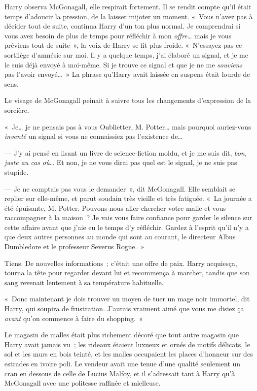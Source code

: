 Harry observa McGonagall, elle respirait fortement.
Il se rendit compte qu'il était temps d'adoucir la pression, de la laisser mijoter un moment.
«~Vous n'avez pas à décider tout de suite, continua Harry d'un ton plus normal.
Je comprendrai si vous avez besoin de plus de temps pour réfléchir à mon \emph{offre}… mais je vous préviens tout de suite~», la voix de Harry se fit plus froide.
«~N'essayez pas ce sortilège d'amnésie sur moi.
Il y a quelque temps, j'ai élaboré un signal, et je me le suis déjà envoyé à moi-même.
Si je trouve ce signal et que je ne me \emph{souviens} pas l'avoir envoyé…~»
La phrase qu'Harry avait laissée en suspens était lourde de sens.

Le visage de McGonagall peinait à suivre tous les changements d'expression de la sorcière.

«~Je… je ne pensais pas à vous Oublietter, M. Potter… mais pourquoi auriez-vous \emph{inventé} un signal si vous ne connaissiez pas l'existence de…

--- J'y ai pensé en lisant un livre de science-fiction moldu, et je me suis dit, \emph{bon, juste au cas où}… Et non, je ne vous dirai pas quel est le signal, je ne suis pas stupide.

--- Je ne comptais pas vous le demander~», dit McGonagall. Elle semblait se replier sur elle-même, et parut soudain très vieille et très fatiguée.
«~La journée a été épuisante, M. Potter. Pouvons-nous aller chercher votre malle et vous raccompagner à la maison~?
Je vais vous faire confiance pour garder le silence sur cette affaire avant que j'aie eu le temps d'y réfléchir.
Gardez à l'esprit qu'il n'y a que deux autres personnes au monde qui sont au courant, le directeur Albus Dumbledore et le professeur Severus Rogue.~»

Tiens. De nouvelles informations~; c'était une offre de paix. Harry acquiesça, tourna la tête pour regarder devant lui et recommença à marcher, tandis que son sang revenait lentement à sa température habituelle.

«~Donc maintenant je dois trouver un moyen de tuer un mage noir immortel, dit Harry, qui soupira de frustration. J'aurais vraiment aimé que vous me disiez ça \emph{avant} qu'on commence à faire du shopping.~»

\later

Le magasin de malles était plus richement décoré que tout autre magasin que Harry avait jamais vu~;
les rideaux étaient luxueux et ornés de motifs délicats, le sol et les murs en bois teinté, et les malles occupaient les places d'honneur sur des estrades en ivoire poli.
Le vendeur avait une tenue d'une qualité seulement un cran en dessous de celle de Lucius Malfoy, et il s'adressait tant à Harry qu'à McGonagall avec une politesse raffinée et mielleuse.

